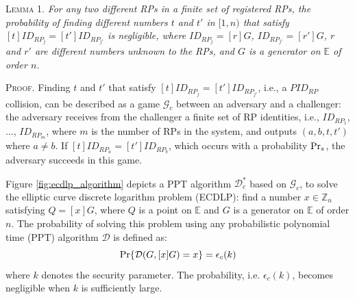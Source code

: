\vspace{1mm}
\noindent\textsc{Lemma 1.} {\em  For any two different RPs in a finite set of registered RPs, the probability of finding different numbers $t$ and $t'$ in $[1,n)$ that satisfy $[t]ID_{RP_j} = [t']ID_{RP_{j'}}$ is negligible, where $ID_{RP_j}=[r]G$, $ID_{RP_{j'}}=[r']G$, $r$ and $r'$ are different numbers unknown to the RPs, and $G$ is a generator on $\mathbb{E}$ of order $n$.}


\oldc
\vspace{0.75mm}
\noindent\textsc{Proof.} 
Finding $t$ and $t'$ that satisfy $[t]ID_{RP_j} = [t']ID_{RP_{j'}}$, i.e., a $PID_{RP}$ collision,
    can be described as a game $\mathcal{G}_c$ between an adversary and a challenger: the adversary receives from the challenger a finite set of RP identities, i.e., $ID_{RP_1}$, ..., $ID_{RP_m}$, where $m$ is the number of RPs in the system, and outputs $(a, b, t, t')$ where $a \neq b$.
    If $[t]ID_{RP_a}=[t']ID_{RP_b}$, which occurs with a probability ${\rm Pr}_s$, the adversary succeeds in this game.

Figure \ref{fig:ecdlp_algorithm} depicts a PPT algorithm $\mathcal{D}^*_c$ based on $\mathcal{G}_c$,
    to solve the elliptic curve discrete logarithm problem (ECDLP):
find a number $x \in \mathbb{Z}_n$ satisfying $Q = [x]G$,
where $Q$ is a point on $\mathbb{E}$ and
    $G$ is a generator on $\mathbb{E}$ of order $n$.
The probability of solving this problem using any probabilistic polynomial time (PPT) algorithm $\mathcal{D}$ is defined as:
\begin{equation*}
{\rm Pr}\{\mathcal{D}(G, [x]G)=x\} = \epsilon_{c}(k)
\end{equation*}
where $k$ denotes the security parameter. The probability, i.e. $\epsilon_{c}(k)$, becomes negligible when $k$ is sufficiently large.


